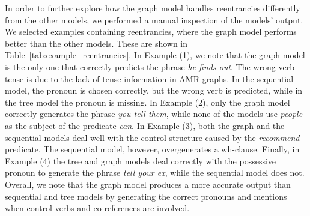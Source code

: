 \documentclass[11pt,a4paper]{article}
\begin{document}
In order to further explore how the graph model handles reentrancies differently from the other models, we performed a manual inspection of the models' output. We selected examples containing reentrancies, where the graph model performs better than the other models. These are shown in Table~\ref{tab:example_reentrancies}. In Example (1), we note that the graph model is the only one that correctly predicts the phrase \emph{he finds out}. The wrong verb tense is due to the lack of tense information in AMR graphs. In the sequential model, the pronoun is chosen correctly, but the wrong verb is predicted, while in the tree model the pronoun is missing. In Example (2), only the graph model correctly generates the phrase \emph{you tell them}, while none of the models use \emph{people} as the subject of the predicate \emph{can}. In Example (3), both the graph and the sequential models deal well with the control structure caused by the \emph{recommend} predicate. The sequential model, however, overgenerates a wh-clause. Finally, in Example (4) the tree and graph models deal correctly with the possessive pronoun to generate the phrase \emph{tell your ex}, while the sequential model does not. Overall, we note that the graph model produces a more accurate output than sequential and tree models by generating the correct pronouns and mentions when control verbs and co-references are involved. 
\end{document}
